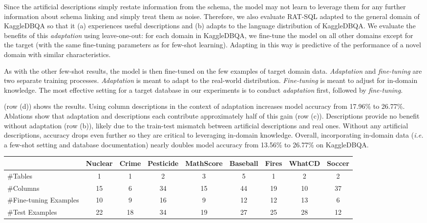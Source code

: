 \documentclass[11pt,a4paper]{article}
\newcommand{\systemname}{\mbox{KaggleDBQA}\xspace}
\newcommand{\ie}{\textit{i.e.}\xspace}
\begin{document}
Since the artificial descriptions simply restate information from the schema, the model may not learn to
leverage them for any further information about schema linking and simply treat them as noise.
Therefore, we also evaluate RAT-SQL adapted to the general domain of \systemname so that it (a) experiences useful
descriptions and (b) adapts to the language distribution of \systemname.
We evaluate the benefits of this \textit{adaptation} using leave-one-out: for each domain in \systemname, we fine-tune the model
on all other domains except for the target (with the same fine-tuning parameters as for few-shot learning).
Adapting in this way is predictive of the performance of a novel domain with similar characteristics.

As with the other few-shot results, the model is then fine-tuned on the few examples of target domain data.
\textit{Adaptation} and \textit{fine-tuning} are two separate training processes. \textit{Adaptation} is meant to adapt to the real-world distribution. 
\textit{Fine-tuning} is meant to adjust for in-domain knowledge. The most effective setting for a target database in our experiments is to conduct \textit{adaptation} first, followed by \textit{fine-tuning}.

 (row (d)) shows the results.
Using column descriptions in the context of adaptation increases model accuracy from 17.96\% to 26.77\%.
Ablations show that adaptation and descriptions each contribute
approximately half of this gain (row (c)).
Descriptions provide no benefit without adaptation (row (b)), likely due to the train-test
mismatch between artificial descriptions and real ones.
Without any artificial descriptions, accuracy drops even further so they are critical to leveraging in-domain knowledge.
Overall, incorporating in-domain data (\ie a few-shot setting and database documentation) nearly doubles model accuracy from 13.56\% to 26.77\% on  \systemname.








\begin{table*}[t]
    \small
    \centering
    \caption{Statistics of each database in \systemname.}
\label{tab:DBanalysis}
    \vspace{-0.5\baselineskip}
    \begin{tabular}{lcccccccc}
        \toprule
          & Nuclear & Crime & Pesticide & MathScore & Baseball & Fires & WhatCD & Soccer  \\
        \midrule
\#Tables & 1 & 1 & 2 & 3 & 5 & 1 & 2 & 2 \\
        \#Columns & 15 & 6 & 34 & 15 & 44 & 19 & 10 & 37 \\ 
        \#Fine-tuning Examples & 10 & 9 & 16 & 9 & 12 & 12 & 13 & 6 \\
        \#Test Examples & 22 & 18 & 34 & 19 & 27 & 25 & 28 & 12 \\
        \bottomrule
    \end{tabular}
\end{table*}
\end{document}
